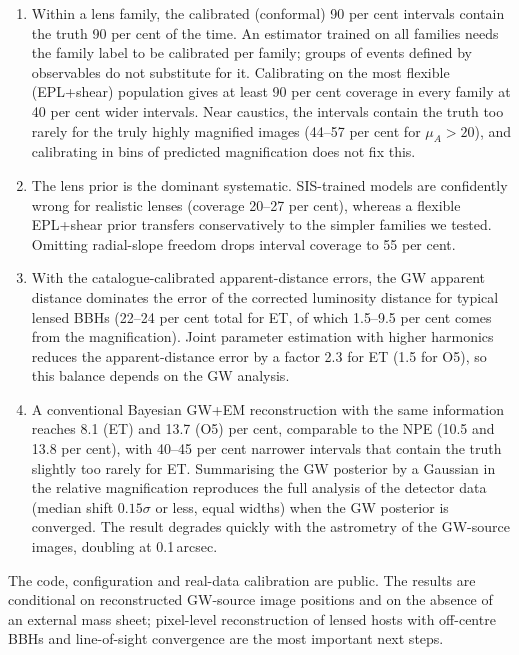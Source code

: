 \begin{enumerate}
\item Within a lens family, the calibrated (conformal) 90 per cent intervals contain the truth 90 per cent of the time. An estimator trained on all families needs the family label to be calibrated per family; groups of events defined by observables do not substitute for it. Calibrating on the most flexible (EPL+shear) population gives at least 90 per cent coverage in every family at 40 per cent wider intervals. Near caustics, the intervals contain the truth too rarely for the truly highly magnified images (44--57 per cent for $\mu_A>20$), and calibrating in bins of predicted magnification does not fix this.
\item The lens prior is the dominant systematic. SIS-trained models are confidently wrong for realistic lenses (coverage 20--27 per cent), whereas a flexible EPL+shear prior transfers conservatively to the simpler families we tested. Omitting radial-slope freedom drops interval coverage to 55 per cent.
\item With the catalogue-calibrated apparent-distance errors, the GW apparent distance dominates the error of the corrected luminosity distance for typical lensed BBHs (22--24 per cent total for ET, of which 1.5--9.5 per cent comes from the magnification). Joint parameter estimation with higher harmonics reduces the apparent-distance error by a factor 2.3 for ET (1.5 for O5), so this balance depends on the GW analysis.
\item A conventional Bayesian GW+EM reconstruction with the same information reaches 8.1 (ET) and 13.7 (O5) per cent, comparable to the NPE (10.5 and 13.8 per cent), with 40--45 per cent narrower intervals that contain the truth slightly too rarely for ET. Summarising the GW posterior by a Gaussian in the relative magnification reproduces the full analysis of the detector data (median shift $0.15\sigma$ or less, equal widths) when the GW posterior is converged. The result degrades quickly with the astrometry of the GW-source images, doubling at 0.1\,arcsec.
\end{enumerate}
The code, configuration and real-data calibration are public. The results are conditional on reconstructed GW-source image positions and on the absence of an external mass sheet; pixel-level reconstruction of lensed hosts with off-centre BBHs and line-of-sight convergence are the most important next steps.
